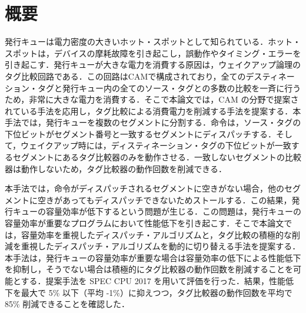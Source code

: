 
\chapter*{概要}
発行キューは電力密度の大きいホット・スポットとして知られている．ホット・スポットは，デバイスの摩耗故障を引き起こし，誤動作やタイミング・エラーを引き起こす．発行キューが大きな電力を消費する原因は，ウェイクアップ論理のタグ比較回路である．この回路はCAMで構成されており，全てのデスティネーション・タグと発行キュー内の全てのソース・タグとの多数の比較を一斉に行うため，非常に大きな電力を消費する．そこで本論文では，CAM の分野で提案されている手法を応用し，タグ比較による消費電力を削減する手法を提案する．本手法では，発行キューを複数のセグメントに分割する．命令は，ソース・タグの下位ビットがセグメント番号と一致するセグメントにディスパッチする．そして，ウェイクアップ時には，ディスティネーション・タグの下位ビットが一致するセグメントにあるタグ比較器のみを動作させる．一致しないセグメントの比較器は動作しないため，タグ比較器の動作回数を削減できる．

本手法では，命令がディスパッチされるセグメントに空きがない場合，他のセグメントに空きがあってもディスパッチできないためストールする．この結果，発行キューの容量効率が低下するという問題が生じる．この問題は，発行キューの容量効率が重要なプログラムにおいて性能低下を引き起こす．そこで本論文では，容量効率を重視したディスパッチ・アルゴリズムと，タグ比較の積極的な削減を重視したディスパッチ・アルゴリズムを動的に切り替える手法を提案する．本手法は，発行キューの容量効率が重要な場合は容量効率の低下による性能低下を抑制し，そうでない場合は積極的にタグ比較器の動作回数を削減することを可能とする．提案手法を SPEC CPU 2017 を用いて評価を行った．結果，性能低下を最大で 5\% 以下（平均 -1\%）に抑えつつ，タグ比較器の動作回数を平均で 85\% 削減できることを確認した．
